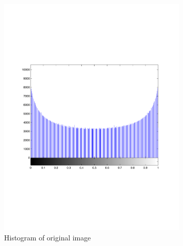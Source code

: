 \documentclass[a4paper]{article}
\begin{document}
\begin{figure}[h!]
        \begin{subfigure}[b]{0.3\textwidth}
                \centering
                \includegraphics[width=\textwidth]{q3-beforehist}
                \caption{Histogram of original image}
                \label{fig:bh}
        \end{subfigure}%
        ~ %
        \begin{subfigure}[b]{0.3\textwidth}
                \centering

\end{subfigure}
\end{figure}
\end{document}
